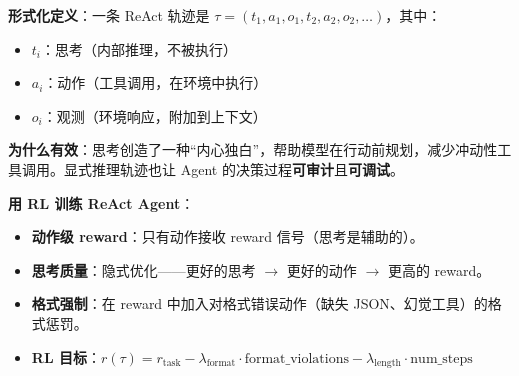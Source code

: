 \textbf{形式化定义}：一条 ReAct 轨迹是 $\tau = (t_1, a_1, o_1, t_2, a_2, o_2, \ldots)$，其中：

\begin{itemize}
  \item $t_i$：思考（内部推理，不被执行）
  \item $a_i$：动作（工具调用，在环境中执行）
  \item $o_i$：观测（环境响应，附加到上下文）
\end{itemize}

\textbf{为什么有效}：思考创造了一种``内心独白''，帮助模型在行动前规划，减少冲动性工具调用。显式推理轨迹也让 Agent 的决策过程\textbf{可审计}且\textbf{可调试}。

\textbf{用 RL 训练 ReAct Agent}：

\begin{itemize}
  \item \textbf{动作级 reward}：只有动作接收 reward 信号（思考是辅助的）。
  \item \textbf{思考质量}：隐式优化——更好的思考 $\rightarrow$ 更好的动作 $\rightarrow$ 更高的 reward。
  \item \textbf{格式强制}：在 reward 中加入对格式错误动作（缺失 JSON、幻觉工具）的格式惩罚。
  \item \textbf{RL 目标}：$r(\tau) = r_{\text{task}} - \lambda_{\text{format}} \cdot \text{format\_violations} - \lambda_{\text{length}} \cdot \text{num\_steps}$
\end{itemize}

